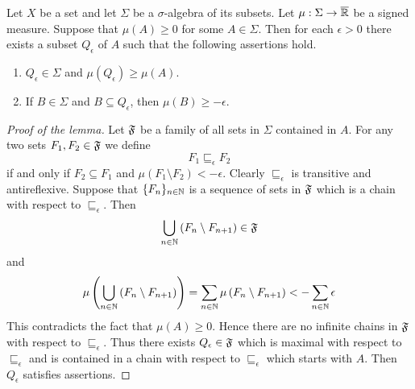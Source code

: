 \begin{lemma}\label{lemma:approximate_positive_set}
    Let $X$ be a set and let $\Sigma$ be a $\sigma$-algebra of its subsets. Let $\mu:\Sigma \rightarrow \overline{{\mathbb R}}$ be a signed measure. Suppose that $\mu(A) \geq 0$ for some $A \in \Sigma$. Then for each $\epsilon > 0$ there exists a subset $Q_{\epsilon}$ of $A$ such that the following assertions hold.
    \begin{enumerate}[label=\emph{\textbf{(\arabic*)}}, leftmargin=3.0em]
        \item $Q_{\epsilon} \in \Sigma$ and $\mu(Q_{\epsilon}) \geq \mu(A)$.
        \item If $B \in \Sigma$ and $B \subseteq Q_{\epsilon}$, then $\mu(B) \geq -\epsilon$.
    \end{enumerate}
\end{lemma}
\begin{proof}[Proof of the lemma]
    Let ${\mathfrak F}$ be a family of all sets in $\Sigma$ contained in $A$. For any two sets $F_1,F_2\in {\mathfrak F}$ we define
    $$F_1 \sqsubseteq_{\epsilon}F_2$$
    if and only if $F_2 \subseteq F_1$ and $\mu(F_1 \setminus F_2) < -\epsilon$. Clearly $\sqsubseteq_{\epsilon}$ is transitive and antireflexive. Suppose that $\{F_n\}_{n\in {\mathbb N}}$ is a sequence of sets in ${\mathfrak F}$ which is a chain with respect to $\sqsubseteq_{\epsilon}$. Then
    $$\bigcup_{n\in {\mathbb N}}\left(F_n\setminus F_{n+1}\right) \in {\mathfrak F}$$
    and
    $$\mu\left(\bigcup_{n\in {\mathbb N}}\left(F_n\setminus F_{n+1}\right)\right) = \sum_{n\in {\mathbb N}}\mu\left(F_n\setminus F_{n+1}\right) < -\sum_{n\in {\mathbb N}}\epsilon$$
    This contradicts the fact that $\mu(A) \geq 0$. Hence there are no infinite chains in ${\mathfrak F}$ with respect to $\sqsubseteq_{\epsilon}$. Thus there exists $Q_{\epsilon} \in {\mathfrak F}$ which is maximal with respect to $\sqsubseteq_{\epsilon}$ and is contained in a chain with respect to $\sqsubseteq_{\epsilon}$ which starts with $A$. Then $Q_{\epsilon}$ satisfies assertions.
\end{proof}

